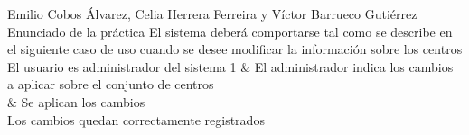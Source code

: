 {Emilio Cobos Álvarez, Celia Herrera Ferreira y Víctor Barrueco Gutiérrez}
{Enunciado de la práctica}
{}
{}
{El sistema deberá comportarse tal como se describe en el siguiente caso de uso cuando se desee modificar la información sobre los centros}
{El usuario es administrador del sistema}
{
1 & El administrador indica los cambios a aplicar sobre el conjunto de centros \\  & Se aplican los cambios \\
}
{Los cambios quedan correctamente registrados}
{}

